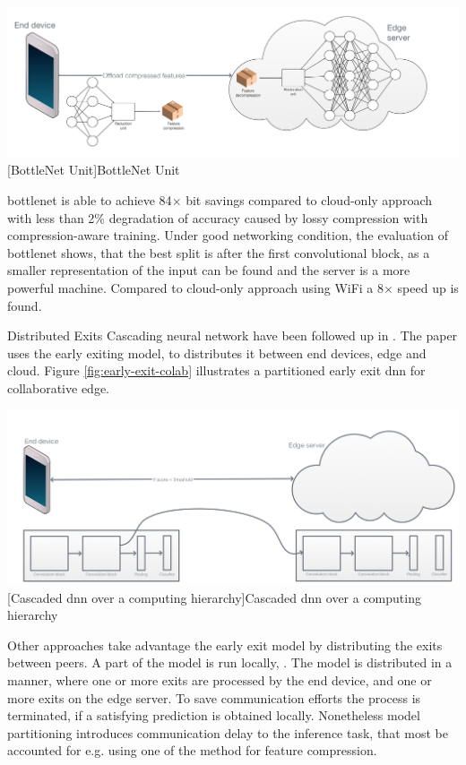 \begin{enumdescript}
	\begin{minipage}[t]{\linewidth}
		\centering
		\includegraphics[width=\linewidth]{figures/models/bottlenet}
		[BottleNet Unit]{BottleNet Unit}
	\end{minipage}

	\gls{bottlenet} is able to achieve 84$\times$ bit savings compared to cloud-only approach with less than 2\% degradation of accuracy caused by lossy compression with compression-aware training. Under good networking condition, the evaluation of \gls{bottlenet} shows, that the best split is after the first convolutional block, as a smaller representation of the input can be found and the server is a more powerful machine. Compared to cloud-only approach using WiFi a 8$\times$ speed up is found. 
	
	
	
	
	\item[Distributed Exits] Cascading neural network have been followed up in \cite{leroux_cascading_2017}. The paper uses the early exiting model, to distributes it between end devices, edge and cloud. Figure \ref{fig:early-exit-colab} illustrates a partitioned early exit \gls{dnn} for collaborative edge. 
	
	\begin{minipage}[t]{\linewidth}
		\centering
		\includegraphics[width=\linewidth]{figures/models/cascaded}
		[Cascaded \gls{dnn} over a computing hierarchy]{Cascaded \gls{dnn} over a computing hierarchy}
		\label{fig:early-exit-colab}
	\end{minipage}
	Other approaches take advantage the early exit model by distributing the exits between peers. A part of the model is run locally, . 
	The model is distributed in a manner, where one or more exits are processed by the end device, and one or more exits on the edge server. To save communication efforts the process is terminated, if a satisfying prediction is obtained locally. Nonetheless model partitioning introduces communication delay to the inference task, that most be accounted for e.g. using one of the method for feature compression.
	

\end{enumdescript}
